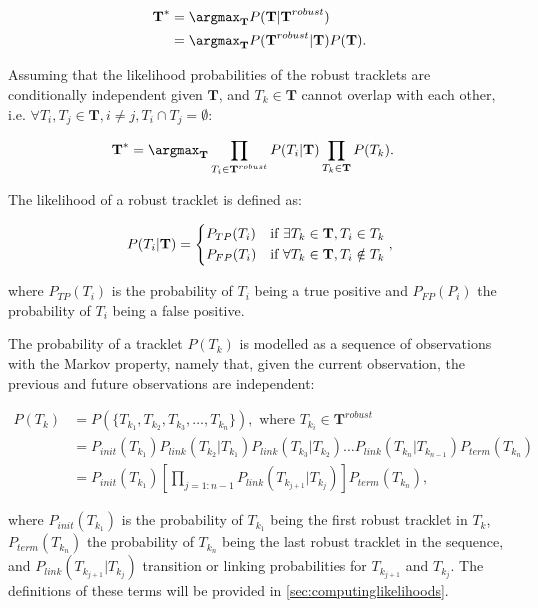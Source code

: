 		\begin{align*}
			\textbf{T}^* &= \argmax_{\textbf{T}} P(\textbf{T} | \textbf{T}^{robust}) \\
			            &= \argmax_{\textbf{T}} P(\textbf{T}^{robust} | \textbf{T} ) P(\textbf{T}) \text{.}
		\end{align*}
				
		Assuming that the likelihood probabilities of the robust tracklets are conditionally independent given $\textbf{T}$, and $ T_k \in \textbf{T}$  cannot overlap with each other, i.e. $ \forall T_i, T_j \in \textbf{T}, i \neq j,  T_i \cap T_j = \emptyset $:
				
		\begin{align*}
			\textbf{T}^* &= \argmax_{\textbf{T}}   \prod_{T_i \in \textbf{T}^{robust}} P(T_i | \textbf{T}) \prod_{T_k \in \textbf{T}} P(T_k) \text{.}
		\end{align*}
		
		The likelihood of a robust tracklet is defined as:
		
		\[
			P(T_i | \textbf{T}) = \begin{dcases}
						   P_{TP}(T_i) & \text{if } \exists T_k \in \textbf{T}, T_i \in T_k \\
						   P_{FP}(T_i) & \text{if } \forall T_k \in \textbf{T}, T_i \notin T_k
						\end{dcases} \text{,}
		\]
  	 	
  	 	\noindent where $ P_{TP}(T_i) $ is the probability of $T_i$ being a true positive and $P_{FP}(P_i) $ the probability of $T_i$ being a false positive.
  	 	
  	 	The probability of a tracklet $P(T_k)$ is modelled as a sequence of observations with the Markov property, namely that, given the current observation, the previous and future observations are independent:
  	 	
  	 	\begin{align*}
  	 		P(T_k) &= P(\{T_{k_1}, T_{k_2}, T_{k_3}, \dots, T_{k_n}\}), \text{ where } T_{k_i} \in \textbf{T}^{robust} \\
  	 			&= P_{init}(T_{k_1}) P_{link}(T_{k_2}|T_{k_1}) P_{link}(T_{k_3}|T_{k_2}) \dots P_{link}(T_{k_n}|T_{k_{n-1}}) P_{term}(T_{k_n}) \\
  	 			&= P_{init}(T_{k_1}) \left[ \prod_{j=1:{n-1}} P_{link}(T_{k_{j+1}}|T_{k_j}) \right] P_{term}(T_{k_n}) \text{,}
  	 	\end{align*}
  	 	
  	 	\noindent where $P_{init}(T_{k_1})$ is the probability of $T_{k_1}$ being the first robust tracklet in $T_k$, $P_{term}(T_{k_n})$ the probability of $T_{k_n}$ being the last robust tracklet in the sequence, and $P_{link}(T_{k_{j+1}}|T_{k_j})$ transition or linking probabilities for $T_{k_{j+1}}$ and $T_{k_{j}}$. The definitions of these terms will be provided in \cref{sec:computinglikelihoods}.
  	 	
